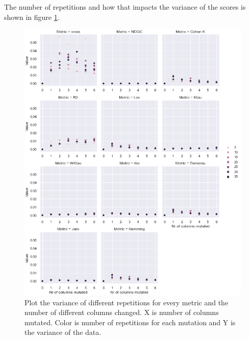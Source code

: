 The number of repetitions and how that impacts the variance of the scores is shown in figure \ref{fig:facet_plot}.






\begin{figure}[htbp]
\centering
\caption{Plot the variance of different repetitions for every metric and the number of different columns changed. X is number of columns mutated. Color is number of repetitions for each mutation and Y is the variance of the data. }\label{fig:facet_plot} 
\includegraphics[scale=0.55]{figures/facet_plot.png}
\end{figure}

